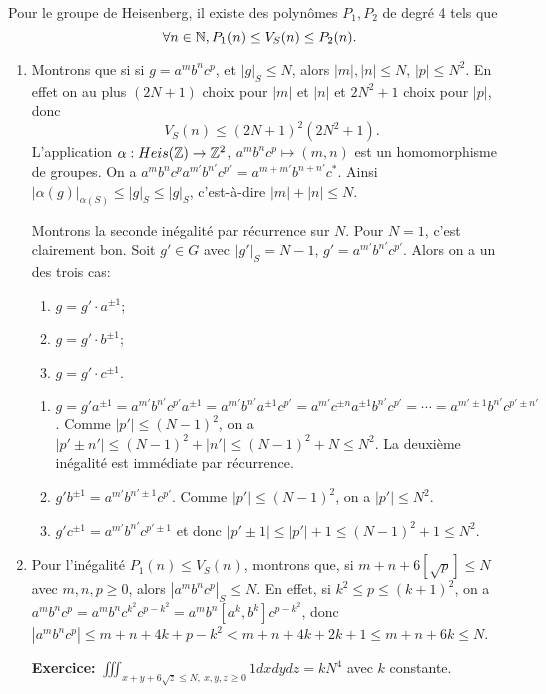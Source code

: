     \begin{prop}
      Pour le groupe de Heisenberg, il existe des polynômes $P_1, P_2$ de degré 4 tels que
        \[\forall n \in \mathbb{N}, P_1(n) \leq V_S(n) \leq P_2(n).\]
    \end{prop}

    \begin{preuve}
      \begin{enumerate}
      \item Montrons que si si $g = a^m b^n c^p$, et $|g|_S \leq N$, alors $|m|, |n| \leq N$, $|p| \leq
        N^2$. En effet on au plus $(2N+1)$ choix pour $|m|$ et $|n|$ et $2N^2 + 1$ choix pour $|p|$, donc
          \[V_S(n) \leq (2N+1)^2(2N^2+1).\]
        L'application $\alpha : Heis(\mathbb{Z}) \to \mathbb{Z}^2$, $a^mb^nc^p \mapsto (m,n)$ est un homomorphisme de
        groupes. On a $a^mb^nc^pa^{m'}b^{n'}c^{p'} = a^{m+m'}b^{n+n'}c^\ast$. Ainsi $|\alpha(g)|_{\alpha(S)}
        \leq |g|_S \leq |g|_S$, c'est-à-dire $|m|+|n| \leq N$. 

        Montrons la seconde inégalité par récurrence sur $N$. Pour $N = 1$, c'est clairement bon. Soit $g' \in
        G$ avec $|g'|_S = N-1$, $g' = a^{m'}b^{n'}c^{p'}$. Alors on a un des trois cas:
        \begin{enumerate}
        \item $g = g' \cdot a^{\pm 1}$;
        \item $g = g' \cdot b^{\pm 1}$;
        \item $g = g' \cdot c^{\pm 1}$.
        \end{enumerate}
        \begin{enumerate}
        \item $g = g'a^{\pm 1} = a^{m'}b^{n'}c^{p'}a^{\pm 1} = a^{m'}b^{n'}a^{\pm 1}c^{p'} = a^{m'}c^{\pm
            n}a^{\pm 1} b^{n'} c^{p'} = \cdots = a^{m'\pm 1} b^{n'}c^{p'\pm n'}$.
            Comme $|p'| \leq (N-1)^2$, on a $|p'\pm n'| \leq (N-1)^2 + |n'| \leq (N-1)^2 + N \leq N^2$. 
            La deuxième inégalité est immédiate par récurrence.
        \item $g'b^{\pm 1} = a^{m'}b^{n' \pm 1} c^{p'}$. Comme $|p'| \leq (N-1)^2$, on a $|p'| \leq N^2$.
        \item $g'c^{\pm 1} = a^{m'}b^{n'}c^{p' \pm 1}$ et donc $|p' \pm 1 | \leq |p'| + 1 \leq (N-1)^2 + 1
          \leq N^2$. 
        \end{enumerate}
      \item Pour l'inégalité $P_1(n) \leq V_S(n)$, montrons que, si $m+n+6[\sqrt{p}] \leq N$ avec $m,n,p\geq
        0$, alors $|a^mb^nc^p|_S \leq N$. En effet, si $k^2 \leq p \leq (k+1)^2$, on a $a^mb^nc^p =
        a^mb^nc^{k^2}c^{p-k^2} = a^mb^n[a^k,b^k]c^{p-k^2}$, donc $|a^mb^nc^p| \leq m + n + 4k + p-k^2 < m + n
        + 4k + 2k + 1 \leq m +  n + 6k \leq N$.
        
        \textbf{Exercice:} $\iiint_{x+y+6\sqrt{z} \leq N,\ x,y,z \geq 0} 1dxdydz = kN^4$ avec $k$ constante.
      \end{enumerate}
    \end{preuve}


